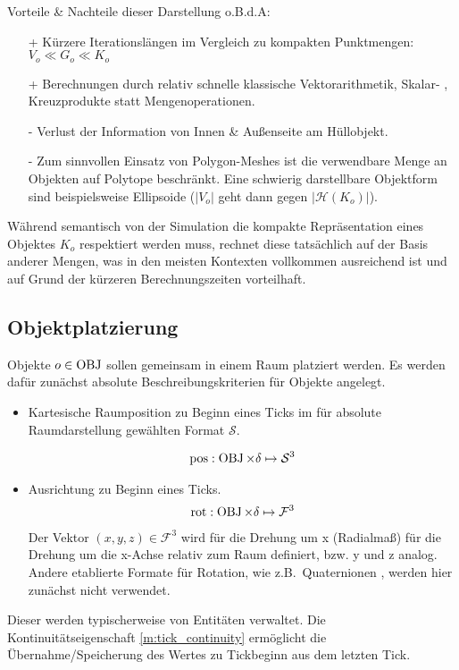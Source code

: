 Vorteile \& Nachteile dieser Darstellung o.B.d.A:
\begin{itemize}
\item [+]Kürzere Iterationslängen im Vergleich zu kompakten Punktmengen: $V_o \ll G_o \ll K_o$
\item [+]Berechnungen durch relativ schnelle klassische Vektorarithmetik, Skalar- , Kreuzprodukte statt Mengenoperationen.
\item [-]Verlust der Information von Innen \& Außenseite am Hüllobjekt.
\item [-]Zum sinnvollen Einsatz von Polygon-Meshes ist die verwendbare Menge an Objekten auf Polytope beschränkt. Eine schwierig darstellbare Objektform sind beispielsweise Ellipsoide ($|V_o|$ geht dann gegen $|\mathcal{H}(K_o)|$).
\end{itemize}

Während semantisch von der Simulation die kompakte Repräsentation eines Objektes $K_o$ respektiert werden muss, rechnet diese tatsächlich auf der Basis anderer Mengen, was in den meisten Kontexten vollkommen ausreichend ist und auf Grund der kürzeren Berechnungszeiten vorteilhaft.

\subsection{Objektplatzierung}
\label{sec:objects_sim}

Objekte $o\in \operatorname{OBJ}$ sollen gemeinsam in einem Raum platziert werden. 
Es werden dafür zunächst absolute Beschreibungskriterien für Objekte angelegt.
\begin{itemize}
\item Kartesische Raumposition zu Beginn eines Ticks im für absolute Raumdarstellung gewählten Format $\mathcal{S}$.

\begin{align}
	\operatorname{pos} : \operatorname{OBJ} \times \delta \mapsto \mathcal{S}^3
\end{align}
\item Ausrichtung zu Beginn eines Ticks.
\begin{align}
	\operatorname{rot} : \operatorname{OBJ} \times \delta \mapsto \mathcal{F}^3
\end{align}
Der Vektor $(x, y, z) \in\mathcal{F}^3$ wird für die Drehung um x (Radialmaß) für die Drehung um die x-Achse relativ zum Raum definiert, bzw. y und z analog. Andere etablierte Formate für Rotation, wie z.B.~Quaternionen \cite[p.80, 4.6]{fourcrossfour}, werden hier zunächst nicht verwendet.
\end{itemize}
Dieser werden typischerweise von Entitäten verwaltet.
Die Kontinuitätseigenschaft \ref{m:tick_continuity} ermöglicht die Übernahme/Speicherung des Wertes zu Tickbeginn aus dem letzten Tick.

